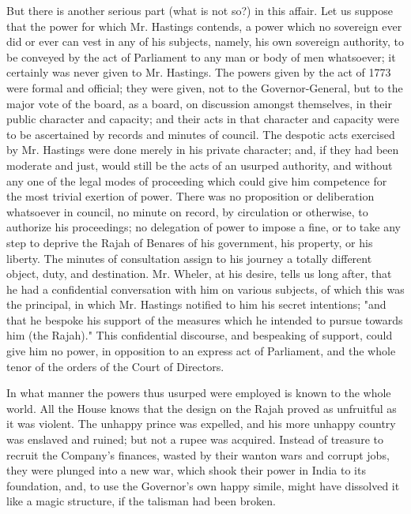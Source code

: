 But there is another serious part (what is not so?) in this affair. Let us suppose that the power for which Mr. Hastings contends, a power which no sovereign ever did or ever can vest in any of his subjects, namely, his own sovereign authority, to be conveyed by the act of Parliament to any man or body of men whatsoever; it certainly was never given to Mr. Hastings. The powers given by the act of 1773 were formal and official; they were given, not to the Governor-General, but to the major vote of the board, as a board, on discussion amongst themselves, in their public character and capacity; and their acts in that character and capacity were to be ascertained by records and minutes of council. The despotic acts exercised by Mr. Hastings were done merely in his private character; and, if they had been moderate and just, would still be the acts of an usurped authority, and without any one of the legal modes of proceeding which could give him competence for the most trivial exertion of power. There was no proposition or deliberation whatsoever in council, no minute on record, by circulation or otherwise, to authorize his proceedings; no delegation of power to impose a fine, or to take any step to deprive the Rajah of Benares of his government, his property, or his liberty. The minutes of consultation assign to his journey a totally different object, duty, and destination. Mr. Wheler, at his desire, tells us long after, that he had a confidential conversation with him on various subjects, of which this was the principal, in which Mr. Hastings notified to him his secret intentions; "and that he bespoke his support of the measures which he intended to pursue towards him (the Rajah)." This confidential discourse, and bespeaking of support, could give him no power, in opposition to an express act of Parliament, and the whole tenor of the orders of the Court of Directors.

In what manner the powers thus usurped were employed is known to the whole world. All the House knows that the design on the Rajah proved as unfruitful as it was violent. The unhappy prince was expelled, and his more unhappy country was enslaved and ruined; but not a rupee was acquired. Instead of treasure to recruit the Company's finances, wasted by their wanton wars and corrupt jobs, they were plunged into a new war, which shook their power in India to its foundation, and, to use the Governor's own happy simile, might have dissolved it like a magic structure, if the talisman had been broken.

